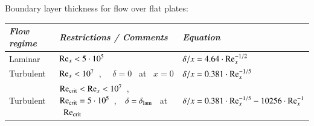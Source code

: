\documentclass[oneside,onecolumn,a4paper,10pt,notitlepage]{tables}
\newcommand{\mfd}{\displaystyle}
\begin{document}
Boundary layer thickness for flow over flat plates:\\[0.5em]
\begin{tabular*}{\textwidth}{lll}
\toprule
\textbf{\em Flow regime} & \textbf{\em Restrictions / Comments} & \textbf{\em Equation} \\
\midrule
\begin{minipage}{1.1in}
  Laminar 
\end{minipage} 
  & \begin{minipage}{3.2in}
     ${\rm Re}_x< 5\cdot 10^5$
    \end{minipage}
  & $\mfd {\delta}/{x}=4.64 \cdot {\rm Re}_x^{-1/2}$\\
\begin{minipage}{1.1in}
  Turbulent 
\end{minipage} 
  & \begin{minipage}{3.2in}
     ${\rm Re}_x< 10^7$~,~~ $\delta=0$~ at ~$x=0$
    \end{minipage}
  & $\mfd {\delta}/{x}=0.381 \cdot {\rm Re}_x^{-1/5}$\\
\begin{minipage}{1.1in}
  Turbulent 
\end{minipage} 
  & \begin{minipage}{3.2in}
     ${\rm Re_{crit}}<{\rm Re}_x< 10^7$~,~~ ${\rm Re_{crit}}=5 \cdot 10^5$~,~~$\delta=\delta_{\rm lam}$~ at ~$\rm Re_{crit}$ 
    \end{minipage}
  & $\mfd {\delta}/{x}=0.381 \cdot {\rm Re}_x^{-1/5}-10256 \cdot {\rm Re}_x^{-1}$\\
\bottomrule
\end{tabular*}
~\\
\vfill
\end{document}
